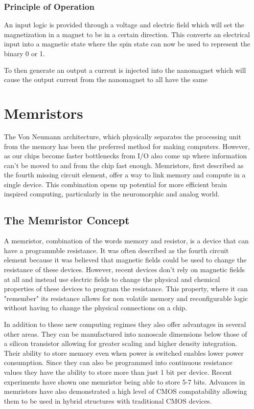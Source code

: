 \documentclass[sigconf,authordraft]{acmart}
\begin{document}
\subsubsection{Principle of Operation}
An input logic is provided through a voltage and electric field which 
will set the magnetization in a magnet to be in a certain direction. This 
converts an electrical input into a magnetic state where the spin state 
can now be used to represent the binary 0 or 1. 

To then generate an output a current is injected into the nanomagnet 
which will cause the output current from the nanomagnet to all have 
the same 

\section{Memristors}
The Von Neumann architecture, which physically separates the processing 
unit from the memory has been the preferred method for making computers. 
However, as our chips become faster bottlenecks from I/O also come up 
where information can't be moved to and from the chip fast enough. Memristors, 
first described as the fourth missing circuit element, offer a way 
to link memory and compute in a single device. This combination opens up
potential for more efficient brain inspired computing, particularly 
in the neuromorphic and analog world. 

\subsection{The Memristor Concept}
A memristor, combination of the words memory and resistor, is a device 
that can have a programmble resistance. It was often described as 
the fourth circuit element because it was believed that magnetic fields 
could be used to change the resistance of these devices. However, recent 
devices don't rely on magnetic fields at all and instead use electric fields 
to change the physical and chemical properties of these devices to program 
the resistance. This property, where it can "remember" its resistance allows 
for non volatile memory and reconfigurable logic without having to change 
the physical connections on a chip.

In addition to these new computing regimes they also offer advantages 
in several other areas. They can be manufactured into nanoscale 
dimensions below those of a silicon transistor allowing for greater scaling 
and higher density integration. Their ability to store memory even 
when power is switched enables lower power consumption. Since they can 
also be programmed into continuous resistance values they have the 
ability to store more than just 1 bit per device. Recent experiments
have shown one memristor being able to store 5-7 bits. Advances 
in memristors have also demonstrated a high level of CMOS compatability 
allowing them to be used in hybrid structures with traditional CMOS 
devices. 
\end{document}
